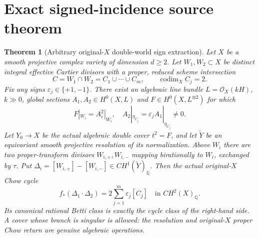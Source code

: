 \documentclass[11pt]{article}
\newtheorem{theorem}{Theorem}
\begin{document}
\section{Exact signed-incidence source theorem}
\begin{theorem}[Arbitrary original-$X$ double-world sign extraction]
Let $X$ be a smooth projective complex variety of dimension
$d\ge2$. Let $W_1,W_2\subset X$ be distinct integral effective
Cartier divisors with a proper, \emph{reduced} scheme intersection
\[
 C=W_1\cap W_2=C_1\cup\cdots\cup C_m,
 \qquad \operatorname{codim}_X C_j=2 .
\]
Fix \emph{any} signs $\varepsilon_j\in\{+1,-1\}$.
There exist an algebraic line bundle $L=\mathcal O_X(kH)$,
$k\gg0$, global sections $A_1,A_2\in H^0(X,L)$ and
$F\in H^0(X,L^{\otimes2})$ for which
\[
 F|_{W_i}=A_i^2|_{W_i},\quad
 A_2|_{\eta_{C_j}}=\varepsilon_j A_1|_{\eta_{C_j}}\ne0. \tag{2}
\]
Let $Y_0\to X$ be the actual algebraic double cover $t^2=F$,
and let $\widetilde Y$ be an equivariant smooth projective
resolution of its normalization. Above $W_i$ there are two
proper-transform divisors $W_{i,+},W_{i,-}$ mapping birationally
to $W_i$, exchanged by $\tau$. Put
$\Delta_i=[W_{i,+}]-[W_{i,-}]\in CH^1(\widetilde Y)_{\mathbb Q}$.
Then the actual \emph{original-$X$} Chow cycle
\[
 \boxed{
  f_*(\Delta_1\cdot\Delta_2)
  =2\sum_{j=1}^m\varepsilon_j[C_j]
  \quad\text{in }CH^2(X)_{\mathbb Q}.
 } \tag{3}
\]
Its canonical rational Betti class is exactly the cycle class
of the right-hand side. A cover whose branch is singular
is allowed: the resolution and original-$X$ proper Chow return
are genuine algebraic operations.
\end{theorem}
\end{document}
